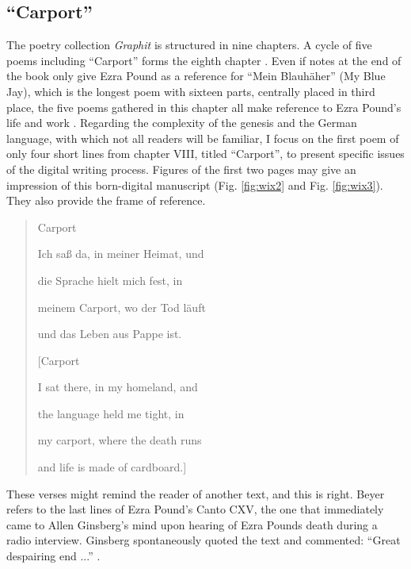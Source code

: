 \documentclass{article}
\begin{document}
\subsection*{``Carport''}

The poetry collection \emph{Graphit} is structured in nine chapters. A
cycle of five poems including ``Carport'' forms the eighth chapter
\citep[171 -- 192]{beyer_graphit_2014}. Even if notes at the end of the book only give
Ezra Pound as a reference for ``Mein Blauhäher'' (My Blue Jay), which is
the longest poem with sixteen parts, centrally placed in third place,
the five poems gathered in this chapter all make reference to Ezra
Pound's life and work \citep[67]{mengeringhaus_was_nodate}. Regarding the complexity
of the genesis and the German language, with which not all readers will
be familiar, I focus on the first poem of only four short lines from
chapter VIII, titled ``Carport'', to present specific issues of the
digital writing process. Figures of the first two pages may give an
impression of this born-digital manuscript (Fig. \ref{fig:wix2} and Fig. \ref{fig:wix3}). They also
provide the frame of reference.

\begin{quote}
Carport

Ich saß da, in meiner Heimat, und

die Sprache hielt mich fest, in

meinem Carport, wo der Tod läuft

und das Leben aus Pappe ist.

\vspace{1em}
 
{[}Carport

I sat there, in my homeland, and

the language held me tight, in

my carport, where the death runs

and life is made of cardboard.{]}

\begin{flushright}
    \parencite[173]{beyer_graphit_2014}
\end{flushright} 
\end{quote}

These verses might remind the reader of another text, and this is right.
Beyer refers to the last lines of Ezra Pound's Canto CXV, the one that
immediately came to Allen Ginsberg's mind upon hearing of Ezra Pounds
death during a radio interview. Ginsberg spontaneously quoted the text
and commented: ``Great despairing end ...'' \citep[185]{ginsberg_allen_1974}.
\end{document}
